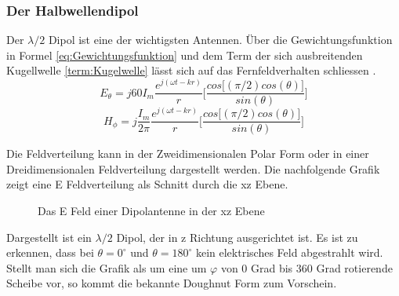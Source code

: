 \subsubsection{Der Halbwellendipol}
Der $\lambda/2$ Dipol ist eine der wichtigsten Antennen. Über die Gewichtungsfunktion in Formel \ref{eq:Gewichtungsfunktion} und dem Term der sich ausbreitenden Kugellwelle \ref{term:Kugelwelle} lässt sich auf das Fernfeldverhalten schliessen \cite{elliott1981antenna}.
\begin{equation}
E_{\theta}=j60I_{m} \frac{e^{j(\omega t - kr)}}{r} \lbrack \frac{cos\lbrack  (\pi/2) cos(\theta)\rbrack}{sin(\theta)} \rbrack
\end{equation}
\begin{equation}
H_{\phi}=j \frac{I_{m}}{2\pi} \frac{e^{j(\omega t - kr)}}{r} \lbrack \frac{cos\lbrack  (\pi/2) cos(\theta)\rbrack}{sin(\theta)} \rbrack
\end{equation}

Die Feldverteilung kann in der  Zweidimensionalen Polar Form oder in einer Dreidimensionalen Feldverteilung dargestellt werden.
Die nachfolgende Grafik zeigt eine E Feldverteilung als Schnitt durch die xz Ebene.\\

\begin{figure}[!ht]
\begin{center}
\end{center}
	\caption{Das E Feld einer Dipolantenne in der xz Ebene}
	\label{fig:DipolEFerd}
\end{figure}



Dargestellt ist ein $\lambda/2$ Dipol, der in z Richtung ausgerichtet ist. Es ist zu erkennen, dass bei $\theta = 0 ^\circ $  und $\theta = 180 ^\circ $ kein elektrisches Feld abgestrahlt wird. Stellt man sich die Grafik als um eine um $\varphi$ von 0 Grad bis 360 Grad rotierende Scheibe vor, so kommt die bekannte Doughnut Form zum Vorschein.

